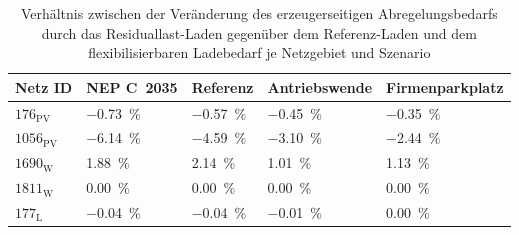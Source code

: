 {
\renewcommand{\arraystretch}{1.2}%
\begin{table}[H]
	\begin{center}
		\caption{Verhältnis zwischen der Veränderung des erzeugerseitigen Abregelungsbedarfs durch das Residuallast-Laden gegenüber dem Referenz-Laden und dem flexibilisierbaren Ladebedarf je Netzgebiet und Szenario}
		\begin{tabu} to 0.85\textwidth {X[0.6] X[1, r] X[1, r] X[1.2, r] X[1.5, r]}
			\toprule
			Netz ID              & NEP C~\num{2035}                           & Referenz                                   & Antriebswende                              & \glqq Firmenparkplatz\grqq                 \\ \midrule
			\(176_{\text{PV}}\)  & \SI[retain-explicit-plus]{-0.73}{\percent} & \SI[retain-explicit-plus]{-0.57}{\percent} & \SI[retain-explicit-plus]{-0.45}{\percent} & \SI[retain-explicit-plus]{-0.35}{\percent} \\
			\(1056_{\text{PV}}\) & \SI[retain-explicit-plus]{-6.14}{\percent} & \SI[retain-explicit-plus]{-4.59}{\percent} & \SI[retain-explicit-plus]{-3.10}{\percent} & \SI[retain-explicit-plus]{-2.44}{\percent} \\
			\(1690_{\text{W}}\)  & \SI[retain-explicit-plus]{+1.88}{\percent} & \SI[retain-explicit-plus]{+2.14}{\percent} & \SI[retain-explicit-plus]{+1.01}{\percent} & \SI[retain-explicit-plus]{+1.13}{\percent} \\
			\(1811_{\text{W}}\)  & \SI[retain-explicit-plus]{+0.00}{\percent} & \SI[retain-explicit-plus]{+0.00}{\percent} & \SI[retain-explicit-plus]{+0.00}{\percent} & \SI[retain-explicit-plus]{+0.00}{\percent} \\
			\(177_{\text{L}}\)   & \SI[retain-explicit-plus]{-0.04}{\percent} & \SI[retain-explicit-plus]{-0.04}{\percent} & \SI[retain-explicit-plus]{-0.01}{\percent} & \SI[retain-explicit-plus]{0.00}{\percent}  \\ \bottomrule
		\end{tabu}
		\label{tab:ratio_cur_demand}
	\end{center}
	\vspace{-3mm}%
\end{table}
}